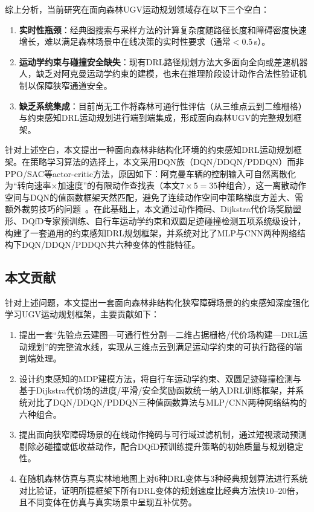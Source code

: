 \documentclass[twocolumn]{elsarticle}
\begin{document}
综上分析，当前研究在面向森林UGV运动规划领域存在以下三个空白：

\begin{enumerate}
  \item \textbf{实时性瓶颈}：经典图搜索与采样方法的计算复杂度随路径长度和障碍密度快速增长，难以满足森林场景中在线决策的实时性要求（通常$<0.5$\,s）。
  \item \textbf{运动学约束与碰撞安全缺失}：现有DRL路径规划方法大多面向全向或差速机器人，缺乏对阿克曼运动学约束的建模，也未在推理阶段设计动作合法性验证机制以保障狭窄通道安全。
  \item \textbf{缺乏系统集成}：目前尚无工作将森林可通行性评估（从三维点云到二维栅格）与约束感知DRL运动规划进行端到端集成，形成面向森林UGV的完整规划框架。
\end{enumerate}

针对上述空白，本文提出一种面向森林非结构化环境的约束感知DRL运动规划框架。在策略学习算法的选择上，本文采用DQN族（DQN/DDQN/PDDQN）而非PPO/SAC等actor-critic方法，原因如下：阿克曼车辆的控制输入可自然离散化为``转向速率$\times$加速度''的有限动作查找表（本文$7\times5=35$种组合），这一离散动作空间与DQN的值函数框架天然匹配，避免了连续动作空间中策略梯度方差大、需额外裁剪技巧的问题~\cite{sichkar2019reinforcement,li2025iqaco}。在此基础上，本文通过动作掩码、Dijkstra代价场奖励塑形、DQfD专家预训练、自行车运动学约束和双圆足迹碰撞检测五项系统级设计，构建了一套通用的约束感知DRL规划框架，并系统对比了MLP与CNN两种网络结构下DQN/DDQN/PDDQN共六种变体的性能特征。

\subsection{本文贡献}

针对上述问题，本文提出一套面向森林非结构化狭窄障碍场景的约束感知深度强化学习UGV运动规划框架，主要贡献如下：

\begin{enumerate}
  \item 提出一套``先验点云建图---可通行性分割---二维占据栅格/代价场构建---DRL运动规划''的完整流水线，实现从三维点云到满足运动学约束的可执行路径的端到端处理。
  \item 设计约束感知的MDP建模方法，将自行车运动学约束、双圆足迹碰撞检测与基于Dijkstra代价场的进度/平滑/安全奖励函数统一纳入DRL训练框架，并系统对比了DQN/DDQN/PDDQN三种值函数算法与MLP/CNN两种网络结构的六种组合。
  \item 提出面向狭窄障碍场景的在线动作掩码与可行域过滤机制，通过短视滚动预测剔除必碰撞或低收益动作，配合DQfD预训练提升策略的初始质量与规划稳定性。
  \item 在随机森林仿真与真实林地地图上对6种DRL变体与3种经典规划算法进行系统对比验证，证明所提框架下所有DRL变体的规划速度比经典方法快10--20倍，且不同变体在仿真与真实场景中呈现互补优势。
\end{enumerate}
\end{document}
